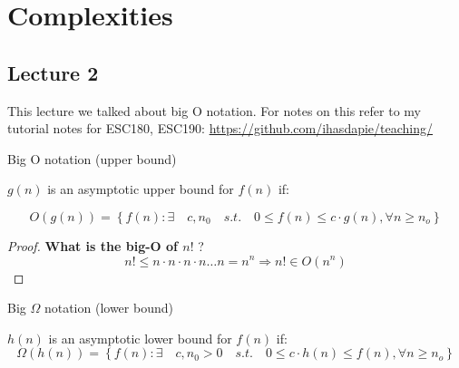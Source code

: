 \documentclass[10pt]{article}
\begin{document}
\section{Complexities}


\subsection{Lecture 2}


This lecture we talked about big O notation. For notes on this refer to my tutorial notes for ESC180, ESC190: \href{https://github.com/ihasdapie/teaching/}{https://github.com/ihasdapie/teaching/}


\begin{definition}
	Big O notation (upper bound)

	$ g(n) $  is an asymptotic upper bound for $ f(n) $ if:

	\begin{equation}
		O(g(n)) = \left\{f(n): \exists \quad c, n_0 \quad s.t. \quad 0 \le  f(n) \le  c\cdot g(n), \forall n \ge  n_o \right\}
		\label{eq:358:bigOh}
	\end{equation}
\end{definition}

\begin{proof}

	\textbf{What is the big-O of $ n! $ }?
	\begin{equation}
			n! \le n \cdot n \cdot n \cdot  n \ldots n = n^n \Rightarrow n! \in O(n^n) 
	\end{equation}
\end{proof}



\begin{definition}
	Big $ \Omega $  notation (lower bound)

	$ h(n) $  is an asymptotic lower bound for $ f(n) $ if:
	\begin{equation}
		\Omega(h(n)) =  \left\{f(n): \exists \quad {c, n_0} > 0 \quad s.t. \quad 0 \le c \cdot h(n) \le  f(n), \forall n \ge  n_o \right\}
		\label{eq:358:bigOmega}
	\end{equation}
\end{definition}
\end{document}
